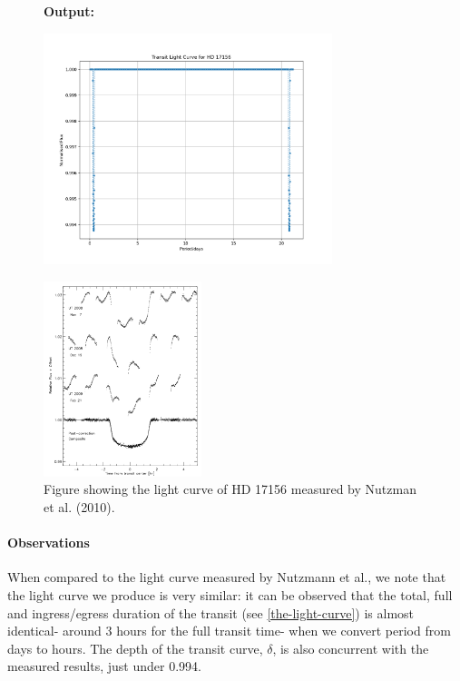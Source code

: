 \documentclass[11pt]{article}
\newcommand*{\figuretitle}[1]{
    	{\textbf{#1}
    	\par\vspace{-1em}}
    }
\begin{document}
\begin{figure}[!hbt]
	\figuretitle{Output:}
	\centering
	\includegraphics[width=0.75\textwidth]{../matplotlib_graphs/transit_1.png}
\end{figure}    


\begin{figure}[!h]
	\centering 
	\includegraphics[width=0.41\textwidth]{../images/light_curve.png}
	\caption{Figure showing the light curve of HD 17156 measured by Nutzman et al. (2010).} 
	\label{Figure 4.a}
\end{figure}

    \hypertarget{observations}{%
\paragraph{Observations}\label{observations_1}}

When compared to the light curve measured by Nutzmann et al., we note
that the light curve we produce is very similar: it can be observed that the total, full and ingress/egress duration of the transit (see \ref{the-light-curve}) is almost identical- around 3 hours for the full transit time- when we convert period from days to hours. The depth of the transit curve, \(\delta\), is also concurrent with the measured results, just under 0.994.
\end{document}
